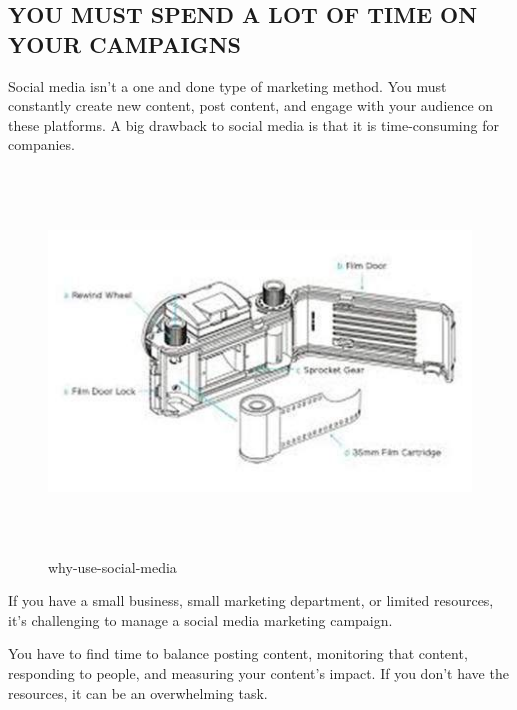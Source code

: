 \documentclass[a4paper]{article}
\begin{document}
  \subsection{ YOU MUST SPEND A LOT OF TIME ON YOUR CAMPAIGNS}
 Social media isn’t a one and done type of marketing method. You must constantly create new content, post content, and engage with your audience on these platforms. A big drawback to social media is that it is time-consuming for companies.
 \begin{figure}
 \centering
 \includegraphics[width=5in,height=4in]{aa}
 \caption{why-use-social-media}
 \end{figure}
 If you have a small business, small marketing department, or limited resources, it’s challenging to manage a social media marketing campaign.

You have to find time to balance posting content, monitoring that content, responding to people, and measuring your content’s impact. If you don’t have the resources, it can be an overwhelming task.
\end{document}
